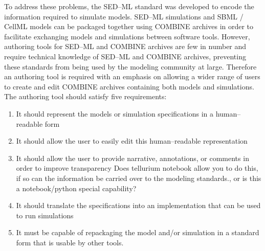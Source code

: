 \documentclass[10pt,letterpaper]{article}
\begin{document}

To address these problems, the SED--ML standard was developed to encode the information required to simulate models. SED--ML simulations and SBML / CellML models can be packaged together using COMBINE archives \cite{bergmann2014combine} in order to facilitate exchanging models and simulations between software tools. However, authoring tools for SED--ML and COMBINE archives are few in number \cite{bergmann2017sed,scharm2014combinearchiveweb} and require technical knowledge of SED--ML and COMBINE archives, preventing these standards from being used by the modeling community at large. Therefore an authoring tool is required with an emphasis on allowing a wider range of users to create and edit COMBINE archives containing both models and simulations. The authoring tool should satisfy five requirements:

\begin{enumerate}
\item It should represent the models or simulation specifications in a human--readable form
\item It should allow the user to easily edit this human--readable representation
\item It should allow the user to provide narrative, annotations, or comments in order to improve transparency {\color{red} Does tellurium notebook allow you to do this, if so can the information be carried over to the modeling standards., or is this a notebook/python special capability?}
\item It should translate the specifications into an implementation that can be used to run simulations
\item It must be capable of repackaging the model and/or simulation in a standard form that is usable by other tools.
\end{enumerate}
\end{document}
